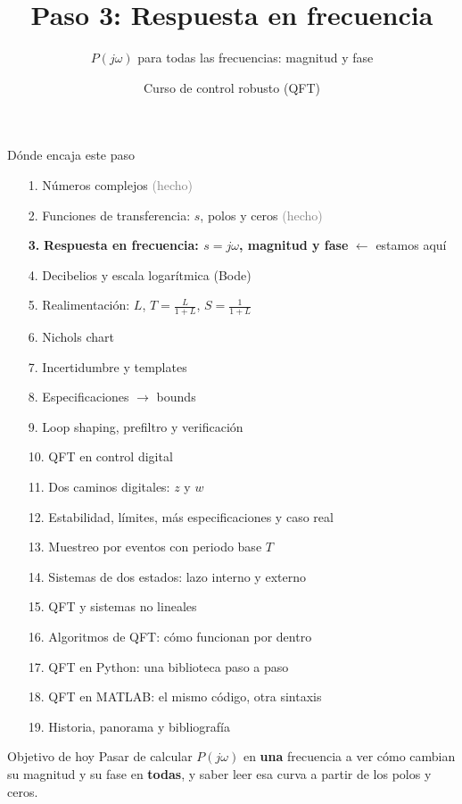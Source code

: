 \documentclass[aspectratio=169,11pt]{beamer}
\title[Respuesta en frecuencia]{Paso 3: Respuesta en frecuencia}
\subtitle{$P(j\omega)$ para todas las frecuencias: magnitud y fase}
\author{Curso de control robusto (QFT)}
\date{}
\begin{document}
\begin{frame}
  \titlepage
\end{frame}

\begin{frame}{Dónde encaja este paso}
  \tiny
  \begin{enumerate}\setlength{\itemsep}{-2pt}
    \item[1.] Números complejos \hfill \textcolor{gray}{(hecho)}
    \item[2.] Funciones de transferencia: $s$, polos y ceros \hfill \textcolor{gray}{(hecho)}
    \item[\textbf{3.}] \textbf{Respuesta en frecuencia: $s=j\omega$, magnitud y fase} \hfill $\leftarrow$ estamos aquí
    \item[4.] Decibelios y escala logarítmica (Bode)
    \item[5.] Realimentación: $L$, $T=\frac{L}{1+L}$, $S=\frac{1}{1+L}$
    \item[6.] Nichols chart
    \item[7.] Incertidumbre y templates
    \item[8.] Especificaciones $\rightarrow$ bounds
    \item[9.] Loop shaping, prefiltro y verificación
    \item[10.] QFT en control digital
    \item[11.] Dos caminos digitales: $z$ y $w$
    \item[12.] Estabilidad, límites, más especificaciones y caso real
    \item[13.] Muestreo por eventos con periodo base $T$
    \item[14.] Sistemas de dos estados: lazo interno y externo
    \item[15.] QFT y sistemas no lineales
    \item[16.] Algoritmos de QFT: cómo funcionan por dentro
    \item[17.] QFT en Python: una biblioteca paso a paso
    \item[18.] QFT en MATLAB: el mismo código, otra sintaxis
    \item[19.] Historia, panorama y bibliografía
  \end{enumerate}
  \vspace{4pt}
  \begin{block}{Objetivo de hoy}
    Pasar de calcular $P(j\omega)$ en \textbf{una} frecuencia a ver cómo cambian su magnitud y su fase en \textbf{todas}, y saber leer esa curva a partir de los polos y ceros.
  \end{block}
\end{frame}
\end{document}
